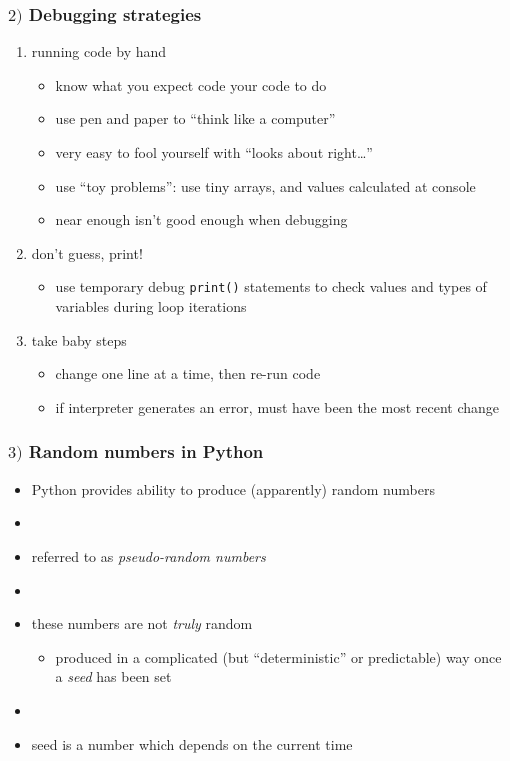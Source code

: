 \documentclass[english,14pt]{beamer}
\newcommand\red[1]{{\color{red} #1}}
\begin{document}
\begin{frame}[fragile]

\frametitle{$2)$ Debugging strategies}

\begin{enumerate}
	\item running code by hand
	\begin{itemize}
		\item know what you expect code your code to do
		\item use pen and paper to ``think like a computer''
		\item very easy to fool yourself with ``looks about right\ldots''
		\item use ``toy problems'': use tiny arrays, and values calculated at console
		\item near enough isn't good enough when debugging
	\end{itemize}
	
	\item don't guess, print!
	\begin{itemize}
		\item use temporary debug \texttt{print()} statements to check values and types of
		variables during loop iterations
	\end{itemize}
	\item take baby steps
		\begin{itemize}
			\item change one line at a time, then re-run code
			\item if interpreter generates an error, must have been the most recent change
		\end{itemize}
\end{enumerate}

\end{frame}


\begin{frame}[fragile]

\frametitle{$3)$ Random numbers in Python}

\begin{itemize}
	\item Python provides ability to produce (apparently) random numbers
	\item[]
	\item referred to as \red{\emph{pseudo-random numbers}}
	\item[]
	\item these numbers are not \emph{truly} random
	\begin{itemize}
		\item produced in a complicated (but ``deterministic'' or predictable) way once a \red{\emph{seed}} has been set
	\end{itemize}	
	\item[]
	\item seed is a number which depends on the current time
		
\end{itemize}

\end{frame}
\end{document}
